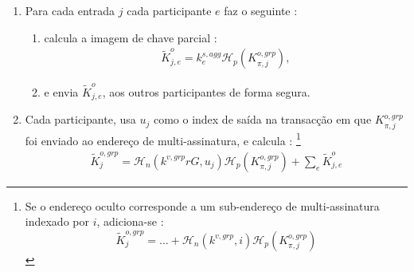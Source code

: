\begin{enumerate}
    \item Para cada entrada $j$ cada participante $e$ faz o seguinte :
    \begin{enumerate}
        \item calcula a imagem de chave parcial : 
\begin{align*}
\tilde{K}^{o}_{j,e} = k^{s,agg}_e \mathcal{H}_p(K^{o,grp}_{\pi,j}) ,
\end{align*}
    \item e envia $\tilde{K}^{o}_{j,e}$, aos outros participantes de forma segura.
    \end{enumerate}
    \item Cada participante, usa $u_j$ como o index de saída na transacção em que $K^{o,grp}_{\pi,j}$ foi enviado ao endereço de multi-assinatura, e calcula :   
\footnote{Se o endereço oculto corresponde a um sub-endereço de multi-assinatura indexado por $i$, adiciona-se :
\[\tilde{K}^{o,grp}_j = ... + \mathcal{H}_n(k^{v,grp},i) \mathcal{H}_p(K^{o,grp}_{\pi,j})\]}
\begin{align*}
\tilde{K}^{o,grp}_j = \mathcal{H}_n(k^{v,grp} r G, u_j) \mathcal{H}_p(K^{o,grp}_{\pi,j}) + \sum_e \tilde{K}^{o}_{j,e}
\end{align*}
\end{enumerate}

